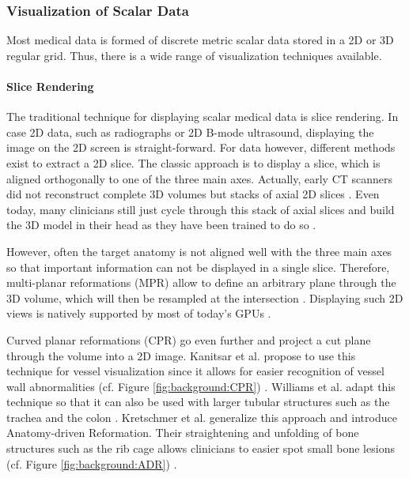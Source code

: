\subsubsection{Visualization of Scalar Data}
Most medical data is formed of discrete metric scalar data stored in a 2D or 3D regular grid.
Thus, there is a wide range of visualization techniques available.

\paragraph{Slice Rendering}
The traditional technique for displaying scalar medical data is slice rendering.
In case 2D data, such as radiographs or 2D B-mode ultrasound, displaying the image on the 2D screen is straight-forward.
For  data however, different methods exist to extract a 2D slice.
The classic approach is to display a slice, which is aligned orthogonally to one of the three main axes.
Actually, early CT scanners did not reconstruct complete 3D volumes but stacks of axial 2D slices \CN.
Even today, many clinicians still just cycle through this stack of axial slices and build the 3D model in their head as they have been trained to do so \CN.

However, often the target anatomy is not aligned well with the three main axes so that important information can not be displayed in a single slice.
Therefore, multi-planar reformations (MPR) allow to define an arbitrary plane through the 3D volume, which will then be resampled at the intersection \II\CN.
Displaying such 2D views is natively supported by most of today's GPUs \CN.

Curved planar reformations (CPR) go even further and project a  cut plane through the volume into a 2D image.
Kanitsar et al. propose to use this technique for vessel visualization since it allows for easier recognition of vessel wall abnormalities (cf. Figure \ref{fig:background:CPR}) \cite{Kanitsar:2002:CPR,Kanitsar:2003:CPR}.
Williams et al. adapt this technique so that it can also be used with larger tubular structures such as the trachea and the colon \cite{Williams:2008:VirtualColonoscopy}.
Kretschmer et al. generalize this approach and introduce Anatomy-driven Reformation.
Their straightening and unfolding of bone structures such as the rib cage allows clinicians to easier spot small bone lesions (cf. Figure \ref{fig:background:ADR}) \cite{Kretschmer:2014:ADR}.

